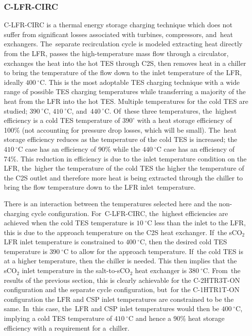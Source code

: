 \documentclass[sustainability,article,accept,moreauthors,pdftex]{Definitions/mdpi}
\begin{document}
\begin{paracol}{2}
\subsubsection{C-LFR-CIRC}

C-LFR-CIRC is a thermal energy storage charging technique which does not suffer from significant losses associated with turbines, compressors, and~heat exchangers. The~separate recirculation cycle is modeled extracting heat directly from the LFR, passes the high-temperature mass flow through a circulator, exchanges the heat into the hot TES through C2S, then removes heat in a chiller to bring the temperature of the flow down to the inlet temperature of the LFR, ideally $400~^{\circ}$C. This is the most adoptable TES charging technique with a wide range of possible TES charging temperatures while transferring a majority of the heat from the LFR into the hot TES. Multiple temperatures for the cold TES are studied; $390~^{\circ}$C, $410~^{\circ}$C, and~$440~^{\circ}$C. Of~these three temperatures, the~highest efficiency is a cold TES temperature of $390^{\circ}$ with a heat storage efficiency of 100\% (not accounting for pressure drop losses, which will be small). The~heat storage efficiency reduces as the temperature of the cold TES is increased; the $410~^{\circ}$C case has an efficiency of 90\% while the $440~^{\circ}$C case has an efficiency of 74\%. This reduction in efficiency is due to the inlet temperature condition on the LFR, the~higher the temperature of the cold TES the higher the temperature of the C2S outlet and therefore more heat is being extracted through the chiller to bring the flow temperature down to the LFR inlet~temperature. 

There is an interaction between the temperatures selected here and the non-charging cycle configuration. For~C-LFR-CIRC, the~highest efficiencies are achieved when the cold TES temperature is $10~^{\circ}$C less than the inlet to the LFR, this is due to the approach temperature on the C2S heat exchanger. If~the sCO$_2$ LFR inlet temperature is constrained to $400~^{\circ}$C, then the desired cold TES temperature is $390~^{\circ}$C to allow for the approach temperature. If~the cold TES is at a higher temperature, then the chiller is needed. This then implies that the sCO$_2$ inlet temperature in the salt-to-sCO$_2$ heat exchanger is  $380~^{\circ}$C. From~the results of the previous section, this is clearly achievable for the C-2HTR3T-ON configuration and the separate cycle configuration, but~for the C-1HTR1T-ON configuration the LFR and CSP inlet temperatures are constrained to be the same. In~this case, the~LFR and CSP inlet temperatures would then be $400~^{\circ}$C, implying a cold TES temperature of  $410~^{\circ}$C and hence a 90\% heat storage efficiency with a requirement for a~chiller.



\end{paracol}
\end{document}
